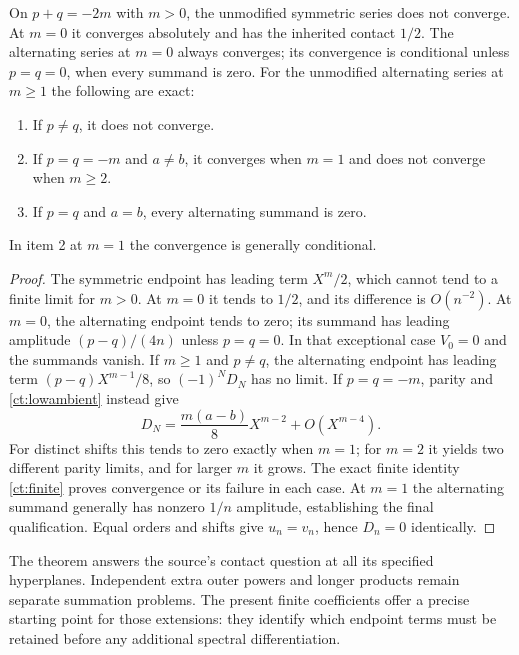 \begin{proposition}
\label{ct:resonantconvergence}
On $p+q=-2m$ with $m>0$, the unmodified symmetric series does not converge.
At $m=0$ it converges absolutely and has the inherited contact $1/2$.
The alternating series at $m=0$ always converges; its convergence is
conditional unless $p=q=0$, when every summand is zero.
For the unmodified alternating series at $m\ge1$ the following are exact:
\begin{enumerate}
 \item If $p\ne q$, it does not converge.
 \item If $p=q=-m$ and $a\ne b$, it converges when $m=1$ and does
       not converge when $m\ge2$.
 \item If $p=q$ and $a=b$, every alternating summand is zero.
\end{enumerate}
In item 2 at $m=1$ the convergence is generally conditional.
\end{proposition}
\begin{proof}
The symmetric endpoint has leading term $X^m/2$, which cannot tend to a
finite limit for $m>0$. At $m=0$ it tends to $1/2$, and its difference
is $O(n^{-2})$. At $m=0$, the alternating endpoint tends to zero;
its summand has leading amplitude $(p-q)/(4n)$ unless $p=q=0$.
In that exceptional case $V_0=0$ and the summands vanish.
If $m\ge1$ and $p\ne q$, the alternating endpoint has leading term
$(p-q)X^{m-1}/8$, so $(-1)^ND_N$ has no limit. If $p=q=-m$, parity
and \eqref{ct:lowambient} instead give
\[
 D_N=\frac{m(a-b)}8X^{m-2}+O(X^{m-4}).
\]
For distinct shifts this tends to zero exactly when $m=1$; for $m=2$
it yields two different parity limits, and for larger $m$ it grows.
The exact finite identity \eqref{ct:finite} proves convergence or its
failure in each case. At $m=1$ the alternating summand generally has
nonzero $1/n$ amplitude, establishing the final qualification. Equal
orders and shifts give $u_n=v_n$, hence $D_n=0$ identically.
\end{proof}

The theorem answers the source's contact question at all its specified
hyperplanes. Independent extra outer powers and longer products remain
separate summation problems. The present finite coefficients offer a
precise starting point for those extensions: they identify which endpoint
terms must be retained before any additional spectral differentiation.
